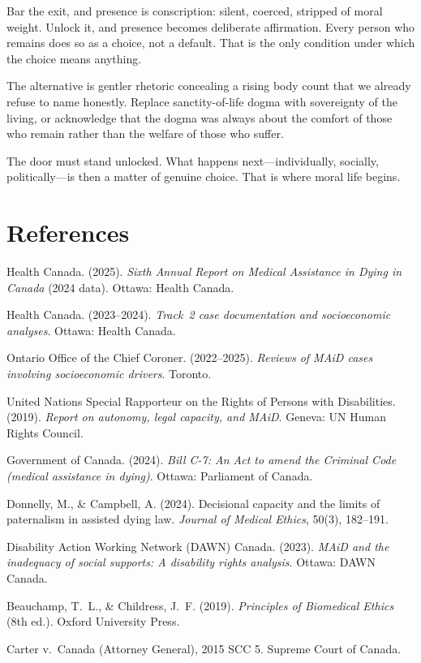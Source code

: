 \documentclass[11pt, letterpaper]{article}
\begin{document}
Bar the exit, and presence is conscription: silent, coerced, stripped of moral weight. Unlock
it, and presence becomes deliberate affirmation. Every person who remains does so as a
choice, not a default. That is the only condition under which the choice means anything.

The alternative is gentler rhetoric concealing a rising body count that we already refuse to
name honestly. Replace sanctity-of-life dogma with sovereignty of the living, or acknowledge
that the dogma was always about the comfort of those who remain rather than the welfare of
those who suffer.

The door must stand unlocked. What happens next---individually, socially, politically---is
then a matter of genuine choice. That is where moral life begins.

\newpage

\section*{References}

\begin{flushleft}
\setlength{\parindent}{0pt}
\setlength{\parskip}{6pt}

Health Canada. (2025). \textit{Sixth Annual Report on Medical Assistance in Dying in
Canada} (2024 data). Ottawa: Health Canada.

\medskip
Health Canada. (2023--2024). \textit{Track~2 case documentation and socioeconomic
analyses}. Ottawa: Health Canada.

\medskip
Ontario Office of the Chief Coroner. (2022--2025). \textit{Reviews of MAiD cases
involving socioeconomic drivers}. Toronto.

\medskip
United Nations Special Rapporteur on the Rights of Persons with Disabilities. (2019).
\textit{Report on autonomy, legal capacity, and MAiD}. Geneva: UN Human Rights Council.

\medskip
Government of Canada. (2024). \textit{Bill C-7: An Act to amend the Criminal Code
(medical assistance in dying)}. Ottawa: Parliament of Canada.

\medskip
Donnelly, M., \& Campbell, A. (2024). Decisional capacity and the limits of
paternalism in assisted dying law. \textit{Journal of Medical Ethics}, 50(3), 182--191.

\medskip
Disability Action Working Network (DAWN) Canada. (2023). \textit{MAiD and the
inadequacy of social supports: A disability rights analysis}. Ottawa: DAWN Canada.

\medskip
Beauchamp, T.~L., \& Childress, J.~F. (2019). \textit{Principles of Biomedical
Ethics} (8th ed.). Oxford University Press.

\medskip
Carter v.\ Canada (Attorney General), 2015 SCC 5. Supreme Court of Canada.

\end{flushleft}

\end{document}
